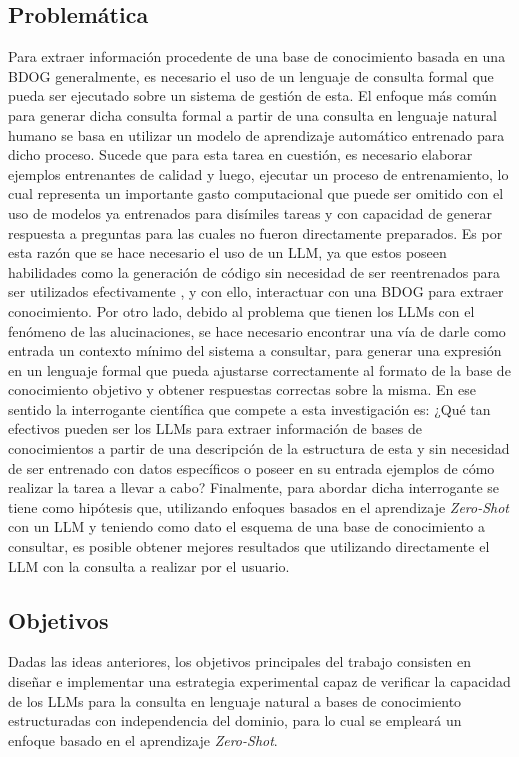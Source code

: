 \subsection*{Problemática}
Para extraer información procedente de una base de conocimiento basada en una BDOG generalmente, es necesario el uso de un lenguaje de consulta formal que pueda ser ejecutado sobre un sistema de gestión de esta. El enfoque más común para generar dicha consulta formal a partir de una consulta en lenguaje natural humano se basa en utilizar un modelo de aprendizaje automático entrenado para dicho proceso. Sucede que para esta tarea en cuestión, es necesario elaborar ejemplos entrenantes de calidad y luego, ejecutar un proceso de entrenamiento, lo cual representa un importante gasto computacional que puede ser omitido con el uso de modelos ya entrenados para disímiles tareas y con capacidad de generar respuesta a preguntas para las cuales no fueron directamente preparados. Es por esta razón que se hace necesario el uso de un LLM, ya que estos poseen habilidades como la generación de código sin necesidad de ser reentrenados para ser utilizados efectivamente \cite{llmsoverview}, y con ello, interactuar con una BDOG para extraer conocimiento. Por otro lado, debido al problema que tienen los LLMs con el fenómeno de las alucinaciones, se hace necesario encontrar una vía de darle como entrada un contexto mínimo del sistema a consultar, para generar una expresión en un lenguaje formal que pueda ajustarse correctamente al formato de la base de conocimiento objetivo y obtener respuestas correctas sobre la misma. En ese sentido la interrogante científica que compete a esta investigación es: ¿Qué tan efectivos pueden ser los LLMs para extraer información de bases de conocimientos a partir de una descripción de la estructura de esta y sin necesidad de ser entrenado con datos específicos o poseer en su entrada ejemplos de cómo realizar la tarea a llevar a cabo? Finalmente, para abordar dicha interrogante se tiene como hipótesis que, utilizando enfoques basados en el aprendizaje \textit{Zero-Shot} con un LLM y teniendo como dato el esquema de una base de conocimiento a consultar, es posible obtener mejores resultados que utilizando directamente el LLM con la consulta a realizar por el usuario.

\subsection*{Objetivos}
Dadas las ideas anteriores, los objetivos principales del trabajo consisten en diseñar e implementar una estrategia experimental capaz de verificar la capacidad de los LLMs para la consulta en lenguaje natural a bases de conocimiento estructuradas con independencia del dominio, para lo cual se empleará un enfoque basado en el aprendizaje \textit{Zero-Shot}.

